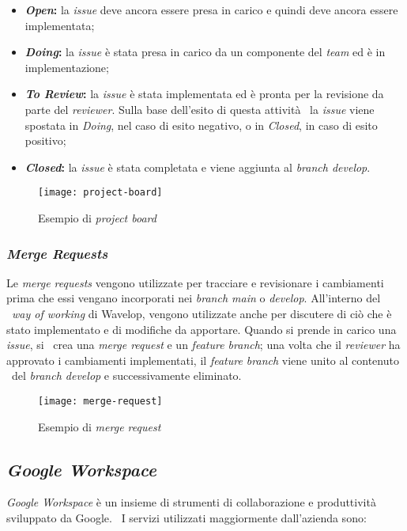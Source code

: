 \begin{itemize}
  \item \textbf{\emph{Open}:} la \emph{issue} deve ancora essere presa in carico e quindi deve ancora essere implementata;
  \item \textbf{\emph{Doing}:} la \emph{issue} è stata presa in carico da un componente del \emph{team} ed è in implementazione;
  \item \textbf{\emph{To Review}:} la \emph{issue} è stata implementata ed è pronta per la revisione da parte del \emph{reviewer}. Sulla base dell'esito di questa attività \
  la \emph{issue} viene spostata in \emph{Doing}, nel caso di esito negativo, o in \emph{Closed}, in caso di esito positivo;
  \item \textbf{\emph{Closed}:} la \emph{issue} è stata completata e viene aggiunta al \emph{branch develop}.
\end{itemize}

\begin{figure}[!ht]
  \begin{center}
    \texttt{[image: project-board]}
    \caption{Esempio di \emph{project board}}
  \end{center}
\end{figure}

\subsubsection{\emph{Merge Requests}}
Le \emph{merge requests} vengono utilizzate per tracciare e revisionare i cambiamenti prima che essi vengano incorporati nei \emph{branch main} o \emph{develop}. All'interno del \
\emph{way of working} di Wavelop, vengono utilizzate anche per discutere di ciò che è stato implementato e di modifiche da apportare. Quando si prende in carico una \emph{issue}, si \
crea una \emph{merge request} e un \emph{feature branch}; una volta che il \emph{reviewer} ha approvato i cambiamenti implementati, il \emph{feature branch} viene unito al contenuto \
del \emph{branch develop} e successivamente eliminato.

\begin{figure}[!ht]
  \begin{center}
    \texttt{[image: merge-request]}
    \caption{Esempio di \emph{merge request}}
  \end{center}
\end{figure}

\newpage
\subsection{\emph{Google Workspace}}
\emph{Google Workspace} è un insieme di strumenti di collaborazione e produttività sviluppato da Google. \
I servizi utilizzati maggiormente dall'azienda sono:


